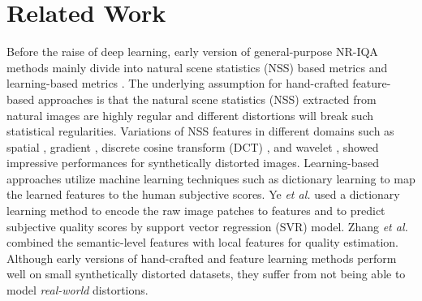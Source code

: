 \documentclass[10pt,twocolumn,letterpaper]{article}
\begin{document}
\section{Related Work}
Before the raise of deep learning, early version of general-purpose NR-IQA methods  mainly   divide  into natural scene statistics (NSS) based metrics 
\cite{moorthy2010two,moorthy2011blind,mittal2012no,saad2012blind,mittal2012making,gao2013universal,
zhang2015feature,xu2016blind,ghadiyaram2017perceptual} and learning-based metrics 
\cite{ye2012no,ye2012unsupervised,zhang2014training,ye2014beyond,zhang2015som,ma2017dipiq}. 
The underlying assumption  for hand-crafted feature-based approaches is that the  natural scene statistics (NSS) extracted from natural images are highly regular \cite{simoncelli2001natural} and different distortions will break such statistical regularities. 
 Variations of NSS features in different domains such as  spatial   \cite{mittal2012no,mittal2012making,zhang2015feature}, gradient  \cite{zhang2015feature}, discrete cosine transform (DCT)    \cite{saad2012blind}, and wavelet  \cite{moorthy2011blind}, showed impressive performances for synthetically distorted images.
Learning-based approaches  utilize  machine learning techniques such as dictionary learning  to map the learned features to the human subjective scores.
Ye \textit{et al.} \cite{ye2012unsupervised} used a dictionary learning method to encode the raw image patches to  features and to predict subjective  quality scores by support vector regression (SVR) model.
 Zhang \textit{et al.} \cite{zhang2015som} combined the semantic-level features  with local features for   quality estimation. 
Although early versions of hand-crafted and feature learning methods perform well on small synthetically distorted datasets, they suffer from not being able  to model \textit{real-world} distortions.
\end{document}
